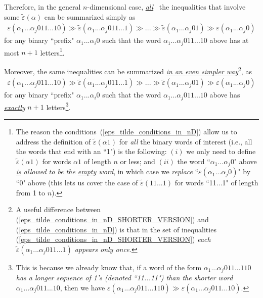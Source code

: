 \documentclass[12pt,letterpaper]{article}
\newcommand{\eps}{\varepsilon}
\newcommand{\et}{\tilde\eps}
\renewcommand{\a}{\alpha}
\begin{document}
Therefore, in the general $n$-dimensional case, \ul{\em all} \ the inequalities that involve some $\et(\a)$ can be summarized simply as
\begin{eqnarray}
\label{eps_tilde_conditions_in_nD}
%
\eps(\a_1...\a_j 011...10) \! \gg \! \et(\a_1...\a_j 011...1) \! \gg \! ... \! \gg \! \et(\a_1...\a_j 01) \! \gg \! \eps(\a_1...\a_j 0)
%
\end{eqnarray}
for any binary ``prefix" $\a_1...\a_i0$ such that the word $\a_1...\a_j 011...10$ above has at most $n+1$ letters\footnote{The reason the conditions~(\ref{eps_tilde_conditions_in_nD})  allow us to address the definition of $\et(\a1)$ for {\em all} the binary words of interest (i.e., all the words that end with an ``1") is the following: $(i)$ we only need to define $\et(\a1)$ for words $\a1$ of length $n$ or less; and  $(ii)$ the word ``$\a_1...\a_j 0$" above {\em \ul{is} allowed to be the \ul{empty} word}, in which case we {\em replace} ``$\eps(\a_1...\a_j 0)$" by ``0" above (this lets us cover the case of $\et(11...1)$ for words ``11...1" of length from 1 to $n$).}.



Moreover, the same inequalities can be summarized \ul{\em in an even simpler way}\footnote{A useful difference between (\ref{eps_tilde_conditions_in_nD_SHORTER_VERSION}) and (\ref{eps_tilde_conditions_in_nD}) is that in the set of inequalities (\ref{eps_tilde_conditions_in_nD_SHORTER_VERSION}) {\em each $\et(\a_1...\a_j 011...1)$ appears only once.}}, as
\begin{eqnarray}
\label{eps_tilde_conditions_in_nD_SHORTER_VERSION}
%
\eps(\a_1...\a_j 011...10) \! \gg \! \et(\a_1...\a_j 011...1) \! \gg \! ... \! \gg \! \et(\a_1...\a_j 01) \! \gg \! \eps(\a_1...\a_j 0)
%
\end{eqnarray}
for any binary ``prefix" $\a_1...\a_i0$ such that the word $\a_1...\a_j 011...10$ above has \ul{\em exactly} $n+1$ letters\footnote{This is because we already know that, if a word of the form $\a_1...\a_j 011...110$ {\em has a longer sequence of 1's (denoted ``11...11") than the shorter word} $\a_1...\a_j 011...10$, then we have $\eps(\a_1...\a_j 011...110) \! \gg \eps(\a_1...\a_j 011...10)$.}.



\end{document}
